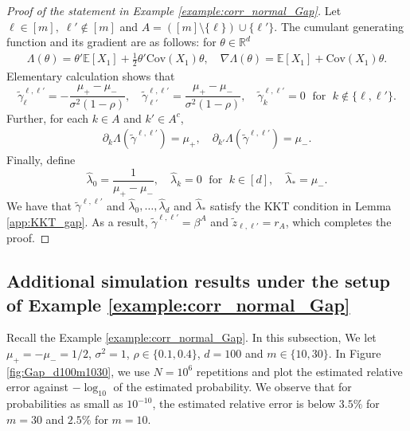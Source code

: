 \documentclass[aap,preprint]{imsart}
\newcommand{\Mstar}{[m]}
\newcommand{\Exp}{{\mathbb{E}}}
\newcommand{\bR}{{\mathbb{R}}}
\theoremstyle{plain}
\theoremstyle{definition}
\begin{document}
\begin{appendix}
\begin{proof}[Proof of the statement in Example \ref{example:corr_normal_Gap}]
Let $\ell \in \Mstar, \; \ell' \not\in \Mstar$ and $A = (\Mstar \setminus \{\ell\}) \cup \{\ell'\}$.  The cumulant generating function and its gradient are as follows: for $\theta \in \bR^d$
\begin{align*}
    \Lambda(\theta) = \theta' \Exp[X_1]+ \frac{1}{2} \theta' \text{Cov}(X_1) \theta, \quad
    \nabla  \Lambda(\theta) = \Exp[X_1] + \text{Cov}(X_1) \theta.
\end{align*}
Elementary calculation shows that
$$
\tilde{\gamma}^{\ell,\ell'}_{\ell} = - \frac{\mu_{+} - \mu_{-}}{\sigma^2(1-\rho)}, 
\quad \tilde{\gamma}^{\ell,\ell'}_{\ell'} =  \frac{\mu_{+} - \mu_{-}}{\sigma^2(1-\rho)}, \quad 
\tilde{\gamma}^{\ell,\ell'}_{k} = 0\; \text{ for } \;k \not \in \{\ell,\ell'\}.
$$
Further, for each $k \in A$ and $k' \in A^c$,
\begin{align*}
   \partial_{k}  \Lambda(\tilde{\gamma}^{\ell,\ell'}) =  \mu_{+},
\quad
   \partial_{k'}  \Lambda(\tilde{\gamma}^{\ell,\ell'}) =  \mu_{-}.
\end{align*}
Finally, define
$$
\widehat{\lambda}_0 = \frac{1}{\mu_{+} - \mu_{-}}, \quad
\widehat{\lambda}_k = 0\; \text{ for } \;k \in [d], \quad
\widehat{\lambda}_{*} = \mu_{-}.
$$
We have that $\tilde{\gamma}^{\ell,\ell'}$ and  $\widehat{\lambda}_{0},\ldots,  \widehat{\lambda}_{d}$ and $\widehat{\lambda}_{*}$ satisfy the KKT condition in Lemma \ref{app:KKT_gap}. As a result, $\tilde{\gamma}^{\ell,\ell'} = \beta^{A}$ and 
$\tilde{z}_{\ell,\ell'} = r_A$, which completes the proof.
\end{proof}

\subsection{Additional simulation results under the setup of Example \ref{example:corr_normal_Gap}} \label{app:gap_example_corrnormal_more_sim}

Recall the Example \ref{example:corr_normal_Gap}. In this subsection, We let $\mu_{+} = -\mu_{-} = 1/2$, $\sigma^2 = 1$, $\rho \in \{0.1,0.4\}$, $d = 100$ and $m \in \{10,30\}$. In Figure \ref{fig:Gap_d100m1030}, we use $N = 10^6$ repetitions and plot the estimated relative error against $-\log_{10}$ of the estimated probability. We observe that for probabilities as small as $10^{-10}$, the estimated relative error is below $3.5\%$ for $m = 30$ and $2.5\%$ for $m = 10$. 


\end{appendix}
\end{document}
